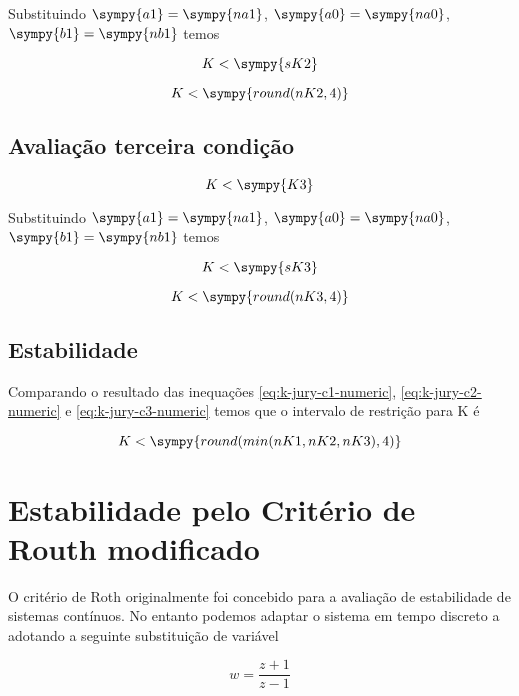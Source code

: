 \documentclass[a4paper,11pt]{article}
\newcommand{\npy}[1]{\sympy{round(#1,4)}}
\begin{document}
Substituindo $\sympy{a1} = \sympy{na1}$, $\sympy{a0} = \sympy{na0}$, $\sympy{b1} = \sympy{nb1}$ temos

$$K < \sympy{sK2}$$

\begin{equation}\label{eq:k-jury-c2-numeric}
    K < \npy{nK2}
\end{equation}

\subsection{Avaliação terceira condição}

\begin{equation}\label{eq:k-jury-c3}
    K < \sympy{K3}
\end{equation}

Substituindo $\sympy{a1} = \sympy{na1}$, $\sympy{a0} = \sympy{na0}$, $\sympy{b1} = \sympy{nb1}$ temos

$$K < \sympy{sK3}$$

\begin{equation}\label{eq:k-jury-c3-numeric}
    K < \npy{nK3}
\end{equation}

\subsection{Estabilidade}

Comparando o resultado das inequações \ref{eq:k-jury-c1-numeric}, \ref{eq:k-jury-c2-numeric} e \ref{eq:k-jury-c3-numeric} temos que o intervalo de restrição para K é

\begin{equation}\label{eq:k-jury-result}
    K < \sympy{round(min(nK1,nK2,nK3),4)}
\end{equation}


\section{Estabilidade pelo Critério de Routh modificado}

O critério de Roth originalmente foi concebido para a avaliação de estabilidade de sistemas contínuos. No entanto podemos adaptar o sistema em tempo discreto a adotando a seguinte substituição de variável

\begin{equation}\label{eq:bilinear-transf-w}
    w = \frac{z+1}{z-1}
\end{equation}
\end{document}
